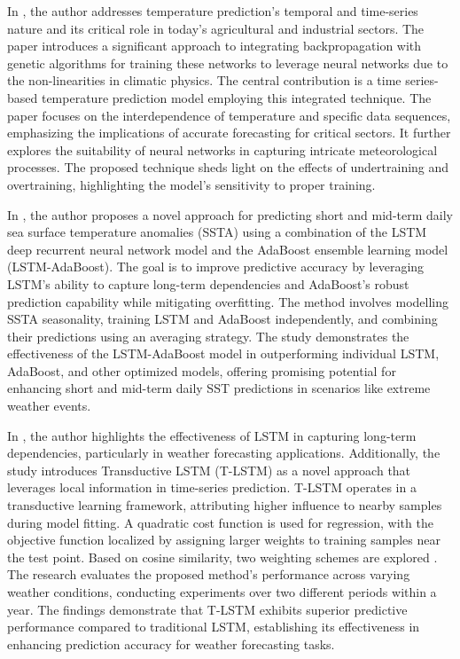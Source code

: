 In \cite{singh2011time}, the author addresses temperature prediction's temporal and time-series nature and its critical role in today's agricultural and industrial sectors. The paper introduces a significant approach to integrating backpropagation with genetic algorithms for training these networks to leverage neural networks due to the non-linearities in climatic physics. The central contribution is a time series-based temperature prediction model employing this integrated technique. The paper focuses on the interdependence of temperature and specific data sequences, emphasizing the implications of accurate forecasting for critical sectors. It further explores the suitability of neural networks in capturing intricate meteorological processes. The proposed technique sheds light on the effects of undertraining and overtraining, highlighting the model's sensitivity to proper training.

In \cite{XIAO2019111358}, the author proposes a novel approach for predicting short and mid-term daily sea surface temperature anomalies (SSTA) using a combination of the LSTM deep recurrent neural network model and the AdaBoost ensemble learning model (LSTM-AdaBoost). The goal is to improve predictive accuracy by leveraging LSTM's ability to capture long-term dependencies and AdaBoost's robust prediction capability while mitigating overfitting. The method involves modelling SSTA seasonality, training LSTM and AdaBoost independently, and combining their predictions using an averaging strategy. The study demonstrates the effectiveness of the LSTM-AdaBoost model in outperforming individual LSTM, AdaBoost, and other optimized models, offering promising potential for enhancing short and mid-term daily SST predictions in scenarios like extreme weather events.

In \cite{xu2019improving}, the author highlights the effectiveness of LSTM in capturing long-term dependencies, particularly in weather forecasting applications. Additionally, the study introduces Transductive LSTM (T-LSTM) as a novel approach that leverages local information in time-series prediction. T-LSTM operates in a transductive learning framework, attributing higher influence to nearby samples during model fitting. A quadratic cost function is used for regression, with the objective function localized by assigning larger weights to training samples near the test point. Based on cosine similarity, two weighting schemes are explored \cite{XIAO2019111358}.
The research evaluates the proposed method's performance across varying weather conditions, conducting experiments over two different periods within a year. The findings demonstrate that T-LSTM exhibits superior predictive performance compared to traditional LSTM, establishing its effectiveness in enhancing prediction accuracy for weather forecasting tasks.



